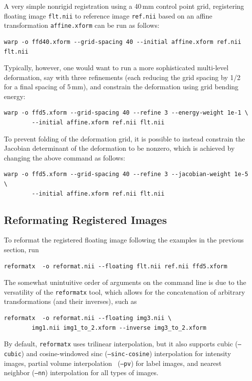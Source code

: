 \documentclass{InsightArticle}
\begin{document}
A very simple nonrigid registration using a 40\,mm control point grid,
registering floating image \verb|flt.nii| to reference image \verb|ref.nii|
based on an affine transformation \verb|affine.xform| can be run as follows:
\begin{verbatim}
warp -o ffd40.xform --grid-spacing 40 --initial affine.xform ref.nii flt.nii
\end{verbatim}
Typically, however, one would want to run a more sophisticated multi-level
deformation, say with three refinements (each reducing the grid spacing by
1/2 for a final spacing of 5\,mm), and constrain the deformation using grid
bending energy:
\begin{verbatim}
warp -o ffd5.xform --grid-spacing 40 --refine 3 --energy-weight 1e-1 \
        --initial affine.xform ref.nii flt.nii
\end{verbatim} 
To prevent folding of the deformation grid, it is possible to
instead constrain the Jacobian determinant \index{Jacobian!registration
constraint} of the deformation to be nonzero, which is achieved by changing
the above command as follows:
\begin{verbatim}
warp -o ffd5.xform --grid-spacing 40 --refine 3 --jacobian-weight 1e-5 \
        --initial affine.xform ref.nii flt.nii
\end{verbatim}

\subsection{Reformating Registered Images}

To reformat the registered floating image following the examples in
the previous section, run
\begin{verbatim}
reformatx  -o reformat.nii --floating flt.nii ref.nii ffd5.xform
\end{verbatim}
The somewhat unintuitive order of arguments on the command line is due to the
versatility of the \verb|reformatx| tool, which allows for the concatenation
of arbitrary transformations (and their inverses), such as
\begin{verbatim}
reformatx  -o reformat.nii --floating img3.nii \
        img1.nii img1_to_2.xform --inverse img3_to_2.xform
\end{verbatim} 
By default, \verb|reformatx| uses trilinear interpolation, but it also
supports cubic ({\tt --cubic}) and cosine-windowed sinc
({\tt --sinc-cosine}) interpolation for intensity images, partial volume
interpolation~\cite{MaesCollVand:1997} ({\tt --pv}) for label images, and
nearest neighbor ({\tt --nn}) interpolation for all types of images.
\end{document}
